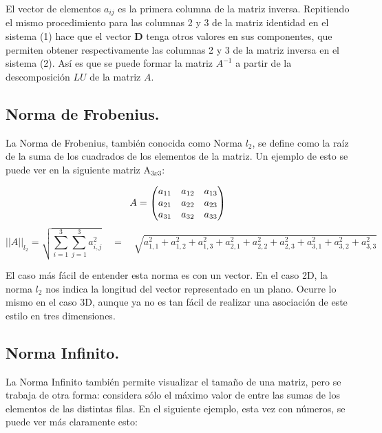 \documentclass[12pt, notitlepage]{article}
\begin{document}

El vector de elementos $a_{ij}$ es la primera columna de la matriz inversa. Repitiendo el mismo procedimiento para las columnas 2 y 3 de la matriz identidad en el sistema (1) hace que el vector \textbf{D} tenga otros valores en sus componentes, que permiten obtener respectivamente las columnas 2 y 3 de la matriz inversa en el sistema (2). Así es que se puede formar la matriz $A^{-1}$ a partir de la descomposición $LU$ de la matriz $A$.

\subsection{Norma de Frobenius.}
La Norma de Frobenius, también conocida como Norma $l_2$, se define como la raíz de la suma de los cuadrados de los elementos de la matriz. Un ejemplo de esto se puede ver en la siguiente matriz $\text{A}_{3x3}$:

\begin{equation*}
A = 
\begin{pmatrix}
a_{11} & a_{12} & a_{13} \\
a_{21} & a_{22} & a_{23} \\
a_{31} & a_{32} & a_{33}
\end{pmatrix} \\
\end{equation*}
\begin{equation*}
||A||_{l_2} = \sqrt{\sum_{i=1}^3 \sum_{j=1}^3 a_{i,j}^2} \quad = \quad \sqrt{a_{1,1}^2 + a_{1,2}^2 + a_{1,3}^2 + a_{2,1}^2 + a_{2,2}^2 + a_{2,3}^2 + a_{3,1}^2 + a_{3,2}^2 + a_{3,3}^2}
\end{equation*}

El caso más fácil de entender esta norma es con un vector. En el caso 2D, la norma $l_2$ nos indica la longitud del vector representado en un plano. Ocurre lo mismo en el caso 3D, aunque ya no es tan fácil de realizar una asociación de este estilo en tres dimensiones.\\

\subsection{Norma Infinito.}

La Norma Infinito también permite visualizar el tamaño de una matriz, pero se trabaja de otra forma: considera sólo el máximo valor de entre las sumas de los elementos de las distintas filas. En el siguiente ejemplo, esta vez con números, se puede ver más claramente esto:
\end{document}
